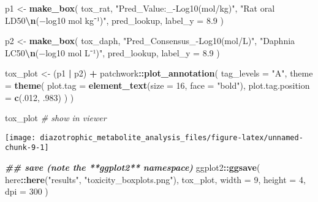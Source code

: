 \documentclass[
]{article}
\newenvironment{Shaded}{\begin{snugshade}}{\end{snugshade}}
\newcommand{\AttributeTok}[1]{\textcolor[rgb]{0.13,0.29,0.53}{#1}}
\newcommand{\CommentTok}[1]{\textcolor[rgb]{0.56,0.35,0.01}{\textit{#1}}}
\newcommand{\DecValTok}[1]{\textcolor[rgb]{0.00,0.00,0.81}{#1}}
\newcommand{\DocumentationTok}[1]{\textcolor[rgb]{0.56,0.35,0.01}{\textbf{\textit{#1}}}}
\newcommand{\FloatTok}[1]{\textcolor[rgb]{0.00,0.00,0.81}{#1}}
\newcommand{\FunctionTok}[1]{\textcolor[rgb]{0.13,0.29,0.53}{\textbf{#1}}}
\newcommand{\NormalTok}[1]{#1}
\newcommand{\OtherTok}[1]{\textcolor[rgb]{0.56,0.35,0.01}{#1}}
\newcommand{\SpecialCharTok}[1]{\textcolor[rgb]{0.81,0.36,0.00}{\textbf{#1}}}
\newcommand{\StringTok}[1]{\textcolor[rgb]{0.31,0.60,0.02}{#1}}
\begin{document}
\begin{Shaded}
\begin{Highlighting}[]
\NormalTok{p1 }\OtherTok{\textless{}{-}} \FunctionTok{make\_box}\NormalTok{(}
\NormalTok{  tox\_rat,}
  \StringTok{"Pred\_Value:\_{-}Log10(mol/kg)"}\NormalTok{,}
  \StringTok{"Rat oral LD50}\SpecialCharTok{\textbackslash{}n}\StringTok{(−log10 mol kg⁻¹)"}\NormalTok{,}
\NormalTok{  pred\_lookup,}
  \AttributeTok{label\_y =} \FloatTok{8.9}
\NormalTok{)}

\NormalTok{p2 }\OtherTok{\textless{}{-}} \FunctionTok{make\_box}\NormalTok{(}
\NormalTok{  tox\_daph,}
  \StringTok{"Pred\_Consensus\_{-}Log10(mol/L)"}\NormalTok{,}
  \StringTok{"Daphnia LC50}\SpecialCharTok{\textbackslash{}n}\StringTok{(−log10 mol L⁻¹)"}\NormalTok{,}
\NormalTok{  pred\_lookup,}
  \AttributeTok{label\_y =} \FloatTok{8.9}
\NormalTok{)}

\NormalTok{tox\_plot }\OtherTok{\textless{}{-}}\NormalTok{ (p1 }\SpecialCharTok{|}\NormalTok{ p2) }\SpecialCharTok{+}
\NormalTok{  patchwork}\SpecialCharTok{::}\FunctionTok{plot\_annotation}\NormalTok{(}
    \AttributeTok{tag\_levels =} \StringTok{"A"}\NormalTok{,}
    \AttributeTok{theme =} \FunctionTok{theme}\NormalTok{(}
      \AttributeTok{plot.tag          =} \FunctionTok{element\_text}\NormalTok{(}\AttributeTok{size =} \DecValTok{16}\NormalTok{, }\AttributeTok{face =} \StringTok{"bold"}\NormalTok{),}
      \AttributeTok{plot.tag.position =} \FunctionTok{c}\NormalTok{(.}\DecValTok{012}\NormalTok{, .}\DecValTok{983}\NormalTok{)}
\NormalTok{    )}
\NormalTok{  )}

\NormalTok{tox\_plot   }\CommentTok{\# show in viewer}
\end{Highlighting}
\end{Shaded}

\texttt{[image: diazotrophic\_metabolite\_analysis\_files/figure-latex/unnamed-chunk-9-1]}

\begin{Shaded}
\begin{Highlighting}[]
\DocumentationTok{\#\# save (note the **ggplot2** namespace)}
\NormalTok{ggplot2}\SpecialCharTok{::}\FunctionTok{ggsave}\NormalTok{(}
\NormalTok{  here}\SpecialCharTok{::}\FunctionTok{here}\NormalTok{(}\StringTok{"results"}\NormalTok{, }\StringTok{"toxicity\_boxplots.png"}\NormalTok{),}
\NormalTok{  tox\_plot,}
  \AttributeTok{width  =} \DecValTok{9}\NormalTok{,}
  \AttributeTok{height =} \DecValTok{4}\NormalTok{,}
  \AttributeTok{dpi    =} \DecValTok{300}
\NormalTok{)}
\end{Highlighting}
\end{Shaded}
\end{document}
